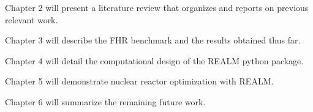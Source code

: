 Chapter 2 will present a literature review that organizes and reports on previous 
relevant work. %

Chapter 3 will describe the \gls{FHR} benchmark and the results obtained thus far. 

Chapter 4 will detail the computational design of the REALM python package. 

Chapter 5 will demonstrate nuclear reactor optimization with REALM. 

Chapter 6 will summarize the remaining future work. 

